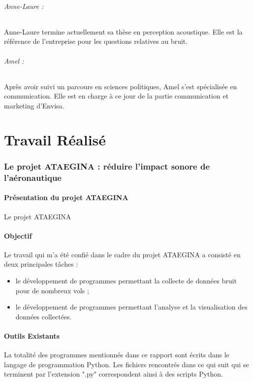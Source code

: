 \documentclass[a4paper]{article}
\begin{document}
    \paragraph{Anne-Laure :}
    Anne-Laure termine actuellement sa thèse en perception acoustique. Elle est la référence de l'entreprise pour les questions relatives au bruit.
    \paragraph{Amel :}
    Après avoir suivi un parcours en sciences politiques, Amel s'est spécialisée en communication. Elle est en charge à ce jour de la partie communication et marketing d'Envisa.
    \newpage
    
    \part{Travail Réalisé}

    \section{Le projet ATAEGINA : réduire l'impact sonore de l'aéronautique}
    \subsection{Présentation du projet ATAEGINA}
    Le projet \gls{ATAEGINA} 
    
    \subsection{Objectif}
    Le travail qui m'a été confié dans le cadre du projet ATAEGINA a consisté en deux principales tâches :
    \begin{itemize}
        \item le développement de programmes permettant la collecte de données bruit pour de nombreux vols ;
        \item le développement de programmes permettant l'analyse et la visualisation des données collectées.
    \end{itemize}
    
    \subsection{Outils Existants}
    La totalité des programmes mentionnés dans ce rapport sont écrits dans le langage de programmation Python. Les fichiers rencontrés dans ce qui suit qui se terminent par l'extension ".py" correspondent ainsi à des scripts Python.
\end{document}
